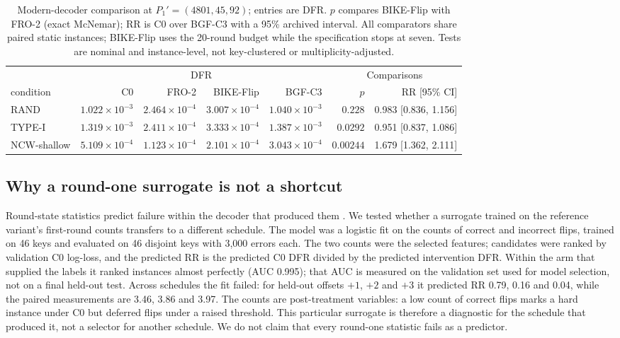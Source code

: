 \documentclass[lettersize,journal]{IEEEtran}
\begin{document}
\begin{table}[!t]
\centering
\small
\caption{Modern-decoder comparison at $P_1'=(4801,45,92)$; entries are DFR. $p$ compares BIKE-Flip with FRO-2 (exact McNemar); RR is C0 over BGF-C3 with a 95\% archived interval. All comparators share paired static instances; BIKE-Flip uses the 20-round budget while the specification stops at seven. Tests are nominal and instance-level, not key-clustered or multiplicity-adjusted.}
\label{tab:modern}
\begin{tabular}{lrrrrrr}
\toprule
 & \multicolumn{4}{c}{DFR} & \multicolumn{2}{c}{Comparisons} \\
\cmidrule(lr){2-5} \cmidrule(lr){6-7}
condition & C0 & FRO-2 & BIKE-Flip & BGF-C3 & $p$ & RR [95\% CI] \\
\midrule
RAND & $1.022\times10^{-3}$ & $2.464\times10^{-4}$ & $3.007\times10^{-4}$ & $1.040\times10^{-3}$ & $0.228$ & 0.983 [0.836, 1.156] \\
TYPE-I & $1.319\times10^{-3}$ & $2.411\times10^{-4}$ & $3.333\times10^{-4}$ & $1.387\times10^{-3}$ & $0.0292$ & 0.951 [0.837, 1.086] \\
NCW-shallow & $5.109\times10^{-4}$ & $1.123\times10^{-4}$ & $2.101\times10^{-4}$ & $3.043\times10^{-4}$ & $0.00244$ & 1.679 [1.362, 2.111] \\
\bottomrule
\end{tabular}
\end{table}
\subsection{Why a round-one surrogate is not a shortcut}\label{sec:counterfactual}

Round-state statistics predict failure within the decoder that produced them \cite{kim2021logistic,paiva2022pickyfix}. We tested whether a surrogate trained on the reference variant's first-round counts transfers to a different schedule. The model was a logistic fit on the counts of correct and incorrect flips, trained on 46 keys and evaluated on 46 disjoint keys with 3,000 errors each. The two counts were the selected features; candidates were ranked by validation C0 log-loss, and the predicted RR is the predicted C0 DFR divided by the predicted intervention DFR. Within the arm that supplied the labels it ranked instances almost perfectly (AUC 0.995); that AUC is measured on the validation set used for model selection, not on a final held-out test. Across schedules the fit failed: for held-out offsets $+1$, $+2$ and $+3$ it predicted RR 0.79, 0.16 and 0.04, while the paired measurements are 3.46, 3.86 and 3.97. The counts are post-treatment variables: a low count of correct flips marks a hard instance under C0 but deferred flips under a raised threshold. This particular surrogate is therefore a diagnostic for the schedule that produced it, not a selector for another schedule. We do not claim that every round-one statistic fails as a predictor.
\end{document}
